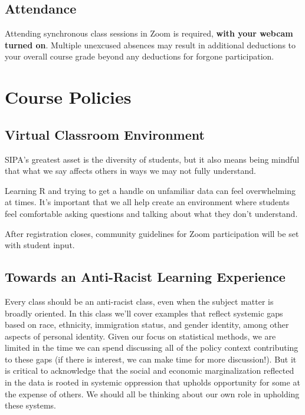 \documentclass[11pt,]{article}
\begin{document}
\hypertarget{attendance}{%
\subsection{Attendance}\label{attendance}}

Attending synchronous class sessions in Zoom is required, \textbf{with
your webcam turned on}. Multiple unexcused absences may result in
additional deductions to your overall course grade beyond any deductions
for forgone participation.

\hypertarget{course-policies}{%
\section{Course Policies}\label{course-policies}}

\hypertarget{virtual-classroom-environment}{%
\subsection{Virtual Classroom
Environment}\label{virtual-classroom-environment}}

SIPA's greatest asset is the diversity of students, but it also means
being mindful that what we say affects others in ways we may not fully
understand.

Learning R and trying to get a handle on unfamiliar data can feel
overwhelming at times. It's important that we all help create an
environment where students feel comfortable asking questions and talking
about what they don't understand.

After registration closes, community guidelines for Zoom participation
will be set with student input.

\hypertarget{towards-an-anti-racist-learning-experience}{%
\subsection{Towards an Anti-Racist Learning
Experience}\label{towards-an-anti-racist-learning-experience}}

Every class should be an anti-racist class, even when the subject matter
is broadly oriented. In this class we'll cover examples that reflect
systemic gaps based on race, ethnicity, immigration status, and gender
identity, among other aspects of personal identity. Given our focus on
statistical methods, we are limited in the time we can spend discussing
all of the policy context contributing to these gaps (if there is
interest, we can make time for more discussion!). But it is critical to
acknowledge that the social and economic marginalization reflected in
the data is rooted in systemic oppression that upholds opportunity for
some at the expense of others. We should all be thinking about our own
role in upholding these systems.
\end{document}
